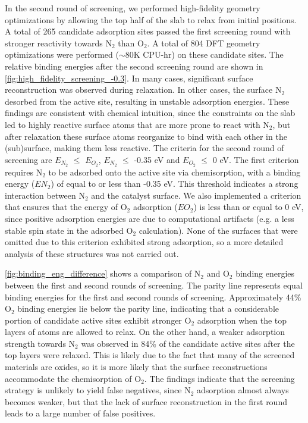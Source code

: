 In the second round of screening, we performed high-fidelity geometry optimizations by allowing the top half of the slab to relax from initial positions. A total of 265 candidate adsorption sites passed the first screening round with stronger reactivity towards N$_2$ than O$_2$. A total of 804 DFT geometry optimizations were performed ($\sim$80K CPU-hr) on these candidate sites. The relative binding energies after the second screening round are shown in \ref{fig:high_fidelity_screening_-0.3}. In many cases, significant surface reconstruction was observed during relaxation. In other cases, the surface N$_2$ desorbed from the active site, resulting in unstable adsorption energies. These findings are consistent with chemical intuition, since the constraints on the slab led to highly reactive surface atoms that are more prone to react with N$_2$, but after relaxation these surface atoms reorganize to bind with each other in the (sub)surface, making them less reactive. The criteria for the second round of screening are $E_{N_2}$ $\le$ $E_{O_2}$, $E_{N_2}$ $\le$ -0.35 eV and $E_{O_2}$ $\le$ 0 eV. The first criterion requires N$_2$ to be adsorbed onto the active site via chemisorption, with a binding energy ($E{N_2}$) of equal to or less than -0.35 eV. This threshold indicates a strong interaction between N$_2$ and the catalyst surface. We also implemented a criterion that ensures that the energy of O$_2$ adsorption ($E{O_2}$) is less than or equal to 0 eV, since positive  adsorption energies are due to computational artifacts (e.g. a less stable spin state in the adsorbed O$_2$ calculation). None of the surfaces that were omitted due to this criterion exhibited strong  adsorption, so a more detailed analysis of these structures was not carried out.

\ref{fig:binding_eng_difference} shows a comparison of N$_2$ and O$_2$ binding energies between the first and second rounds of screening. The parity line represents equal binding energies for the first and second rounds of screening. Approximately 44\% O$_2$ binding energies lie below the parity line, indicating that a considerable portion of candidate active sites exhibit stronger O$_2$ adsorption when the top layers of atoms are allowed to relax. On the other hand, a weaker adsorption strength towards N$_2$ was observed in 84\% of the candidate active sites after the top layers were relaxed. This is likely due to the fact that many of the screened materials are oxides, so it is more likely that the surface reconstructions accommodate the chemisorption of O$_2$. The findings indicate that the screening strategy is unlikely to yield false negatives, since N$_2$ adsorption almost always becomes weaker, but that the lack of surface reconstruction in the first round leads to a large number of false positives.

